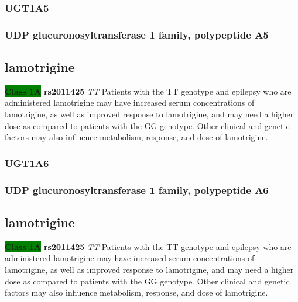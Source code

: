 \documentclass{book}
\begin{document}
\subsubsection{ UGT1A5 }
\subsubsection{ UDP glucuronosyltransferase 1 family, polypeptide A5 }

\subsection{ lamotrigine }


\begin{center}



\textbf{\colorbox{green} {Class 1A}} \textbf{ rs2011425 } \textit{ TT }
Patients with the TT genotype and epilepsy who are administered lamotrigine may have increased serum concentrations of lamotrigine, as well as improved response to lamotrigine, and may need a higher dose as compared to patients with the GG genotype. Other clinical and genetic factors may also influence metabolism, response, and dose of lamotrigine.  

\end{center}






\subsubsection{ UGT1A6 }
\subsubsection{ UDP glucuronosyltransferase 1 family, polypeptide A6 }

\subsection{ lamotrigine }


\begin{center}



\textbf{\colorbox{green} {Class 1A}} \textbf{ rs2011425 } \textit{ TT }
Patients with the TT genotype and epilepsy who are administered lamotrigine may have increased serum concentrations of lamotrigine, as well as improved response to lamotrigine, and may need a higher dose as compared to patients with the GG genotype. Other clinical and genetic factors may also influence metabolism, response, and dose of lamotrigine.  

\end{center}
\end{document}
